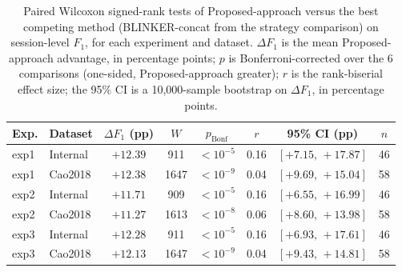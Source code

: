 \begin{table}[ht]
  \centering
  \caption{Paired Wilcoxon signed-rank tests of Proposed-approach versus the best competing method (BLINKER-concat from the strategy comparison) on session-level $F_1$, for each experiment and dataset. $\Delta F_1$ is the mean Proposed-approach advantage, in percentage points; $p$ is Bonferroni-corrected over the 6 comparisons (one-sided, Proposed-approach greater); $r$ is the rank-biserial effect size; the 95\% CI is a 10{,}000-sample bootstrap on $\Delta F_1$, in percentage points.}
  \label{tab:exp_stats}
  \begin{tabular}{llcccccc}
    \toprule
    Exp. & Dataset & $\Delta F_1$ (pp) & $W$ & $p_{\mathrm{Bonf}}$ & $r$ & 95\% CI (pp) & $n$ \\
    \midrule
    exp1 & Internal & $+12.39$ & 911 & $<10^{-5}$ & 0.16 & $[+7.15,\,+17.87]$ & 46 \\
    exp1 & Cao2018 & $+12.38$ & 1647 & $<10^{-9}$ & 0.04 & $[+9.69,\,+15.04]$ & 58 \\
    exp2 & Internal & $+11.71$ & 909 & $<10^{-5}$ & 0.16 & $[+6.55,\,+16.99]$ & 46 \\
    exp2 & Cao2018 & $+11.27$ & 1613 & $<10^{-8}$ & 0.06 & $[+8.60,\,+13.98]$ & 58 \\
    exp3 & Internal & $+12.28$ & 911 & $<10^{-5}$ & 0.16 & $[+6.93,\,+17.61]$ & 46 \\
    exp3 & Cao2018 & $+12.13$ & 1647 & $<10^{-9}$ & 0.04 & $[+9.43,\,+14.81]$ & 58 \\
    \bottomrule
  \end{tabular}
\end{table}
